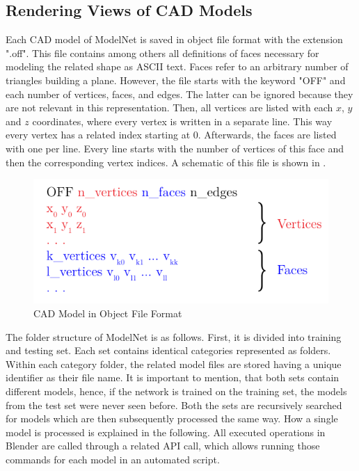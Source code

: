 \subsection{Rendering Views of CAD Models}
\label{sec:dataset-rendering}
Each CAD model of ModelNet is saved in object file format with the extension ".off".
This file contains among others all definitions of faces necessary for modeling the related shape as ASCII text.
Faces refer to an arbitrary number of triangles building a plane.
However, the file starts with the keyword "OFF" and each number of vertices, faces, and edges.
The latter can be ignored because they are not relevant in this representation.
Then, all vertices are listed with each $x$, $y$ and $z$ coordinates, where every vertex is written in a separate line.
This way every vertex has a related index starting at 0.
Afterwards, the faces are listed with one per line.
Every line starts with the number of vertices of this face and then the corresponding vertex indices.
A schematic of this file is shown in .
\begin{figure}
	\centering
	\includegraphics[]{images/off.pdf}
	\caption{CAD Model in Object File Format}
	\label{fig:off}
\end{figure}

The folder structure of ModelNet is as follows.
First, it is divided into training and testing set.
Each set contains identical categories represented as folders.
Within each category folder, the related model files are stored having a unique identifier as their file name.
It is important to mention, that both sets contain different models, hence, if the network is trained on the training set, the models from the test set were never seen before.
Both the sets are recursively searched for models which are then subsequently processed the same way.
How a single model is processed is explained in the following.
All executed operations in Blender are called through a related API call, which allows running those commands for each model in an automated script.


